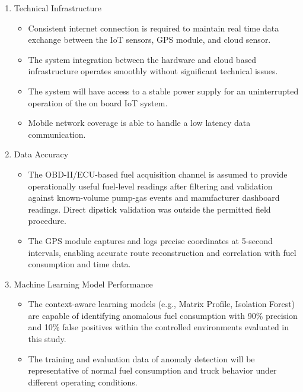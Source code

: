 \begin{enumerate}
\item Technical Infrastructure
	\begin{itemize}
		\item Consistent internet connection is required to maintain real time data exchange between the IoT sensors, GPS module, and cloud sensor.
		\item The system integration between the hardware and cloud based infrastructure operates smoothly without significant technical issues.
		\item The system will have access to a stable power supply for an uninterrupted operation of the on board IoT system.
		\item Mobile network coverage is able to handle a low latency data communication.		
	\end{itemize}

\item Data Accuracy
    \begin{itemize}
        \item The OBD-II/ECU-based fuel acquisition channel is assumed to provide operationally useful fuel-level readings after filtering and validation against known-volume pump-gas events and manufacturer dashboard readings. Direct dipstick validation was outside the permitted field procedure.
        \item The GPS module captures and logs precise coordinates at 5-second intervals, enabling accurate route reconstruction and correlation with fuel consumption and time data.
    \end{itemize}


\item Machine Learning Model Performance
	\begin{itemize}
		\item The context-aware learning models (e.g., Matrix Profile, Isolation Forest) are capable of identifying anomalous fuel consumption with 90\% precision and 10\% false positives within the controlled environments evaluated in this study.
		\item The training and evaluation data of anomaly detection will be representative of normal fuel consumption and truck behavior under different operating conditions.
	\end{itemize}


\end{enumerate}
